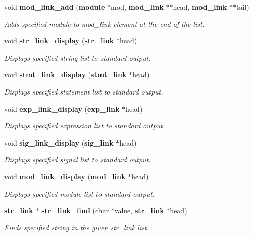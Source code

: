 \begin{CompactItemize}
void {\bf mod\_\-link\_\-add} ({\bf module} $\ast$mod, {\bf mod\_\-link} $\ast$$\ast$head, {\bf mod\_\-link} $\ast$$\ast$tail)
\begin{CompactList}\small\item\em Adds specified module to mod\_\-link element at the end of the list.\item\end{CompactList}\item 
void {\bf str\_\-link\_\-display} ({\bf str\_\-link} $\ast$head)
\begin{CompactList}\small\item\em Displays specified string list to standard output.\item\end{CompactList}\item 
void {\bf stmt\_\-link\_\-display} ({\bf stmt\_\-link} $\ast$head)
\begin{CompactList}\small\item\em Displays specified statement list to standard output.\item\end{CompactList}\item 
void {\bf exp\_\-link\_\-display} ({\bf exp\_\-link} $\ast$head)
\begin{CompactList}\small\item\em Displays specified expression list to standard output.\item\end{CompactList}\item 
void {\bf sig\_\-link\_\-display} ({\bf sig\_\-link} $\ast$head)
\begin{CompactList}\small\item\em Displays specified signal list to standard output.\item\end{CompactList}\item 
void {\bf mod\_\-link\_\-display} ({\bf mod\_\-link} $\ast$head)
\begin{CompactList}\small\item\em Displays specified module list to standard output.\item\end{CompactList}\item 
{\bf str\_\-link} $\ast$ {\bf str\_\-link\_\-find} (char $\ast$value, {\bf str\_\-link} $\ast$head)
\begin{CompactList}\small\item\em Finds specified string in the given str\_\-link list.\item\end{CompactList}\item 

\end{CompactItemize}
